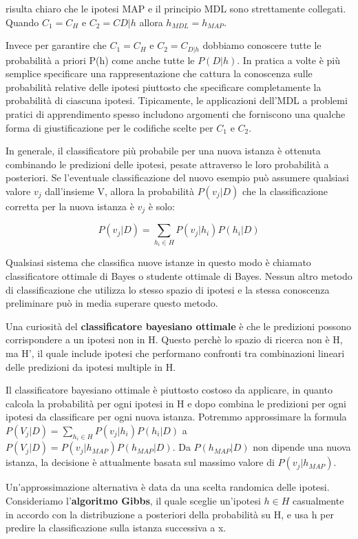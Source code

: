 \documentclass[a4paper]{extarticle}
\begin{document}
risulta chiaro che le ipotesi MAP e il principio MDL sono strettamente collegati. Quando $C_1 = C_H$ e $C_2=C{D|h}$ allora $h_{MDL} = h_{MAP}$.

Invece per garantire che $C_1=C_H$ e $C_2=C_{D|h}$ dobbiamo conoscere tutte le probabilità a priori P(h) come anche tutte le $P(D|h)$. In pratica a volte è più semplice specificare una rappresentazione che cattura la conoscenza sulle probabilità relative delle ipotesi piuttosto che specificare completamente la probabilità di ciascuna ipotesi. Tipicamente, le applicazioni dell’MDL a problemi pratici di apprendimento spesso includono argomenti che forniscono una qualche forma di giustificazione per le codifiche scelte per $C_1$ e $C_2$.

In generale, il classificatore più probabile per una nuova istanza è ottenuta combinando le predizioni delle ipotesi, pesate attraverso le loro probabilità a posteriori. Se l'eventuale classificazione del nuovo esempio può assumere qualsiasi valore $v_j$ dall'insieme V, allora la probabilità $P(v_j|D)$  che la classificazione corretta per la nuova istanza è $v_j$ è solo:

\begin{equation*}
P(v_j|D) = \sum\limits_{h_i \in H} P(v_j | h_i) P(h_i|D) 
\end{equation*}

Qualsiasi sistema che classifica nuove istanze in questo modo è chiamato classificatore ottimale di Bayes o studente ottimale di Bayes. Nessun altro metodo di classificazione che utilizza lo stesso spazio di ipotesi e la stessa conoscenza preliminare può in media superare questo metodo.

Una curiosità del \textbf{classificatore bayesiano ottimale} è che le predizioni possono corrispondere a un ipotesi non in H. Questo perchè lo spazio di ricerca non è H, ma H', il quale include ipotesi che performano confronti tra combinazioni lineari delle predizioni da ipotesi multiple in H.

Il classificatore bayesiano ottimale è piuttosto costoso da applicare, in quanto calcola la probabilità per ogni ipotesi in H e dopo combina le predizioni per ogni ipotesi da classificare per ogni nuova istanza. Potremmo approssimare la formula $P(V_j | D) = \sum\limits_{h_i \in H} P(v_j | h_i)P(h_i|D)$ a $P(V_j | D) = P(v_j | h_{MAP})P(h_{MAP}|D)$. Da $P(h_{MAP}|D)$ non dipende una nuova istanza, la decisione è attualmente basata sul massimo valore di $P(v_j|h_{MAP})$.

Un'approssimazione alternativa è data da una scelta randomica delle ipotesi. Consideriamo l'\textbf{algoritmo Gibbs}, il quale sceglie un'ipotesi $h\in H$ casualmente in accordo con la distribuzione a posteriori della probabilità su H, e usa h per predire la classificazione sulla istanza successiva a x.
\end{document}
